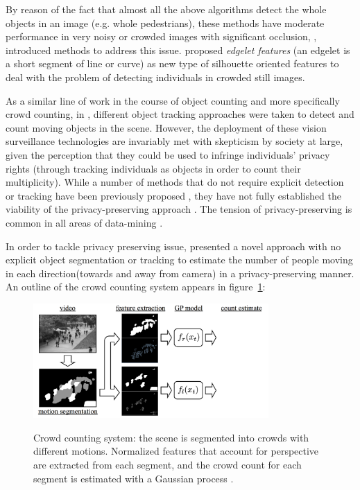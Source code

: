 By reason of the fact that almost all the above algorithms detect the whole objects in an image (e.g. whole pedestrians), these methods have moderate performance in very noisy or crowded images with significant occlusion, \citealt*{wu2005detection, lin2001estimation}, introduced methods to address this issue. \citealt*{wu2005detection} proposed \textit{edgelet features} (an edgelet is a short segment of line or curve) as new type of silhouette oriented features to deal with the problem of detecting individuals in crowded still images. %

\indent As a similar line of work in the course of object counting and more specifically crowd counting, in \cite{rabaud2006counting, brostow2006unsupervised, leibe2007coupled}, different object tracking approaches were taken to detect and count moving objects in the scene. However, the deployment of these vision surveillance technologies are invariably met with skepticism by society at large, given the perception that they could be used to infringe individuals' privacy rights (through tracking individuals as objects in order to count their multiplicity). While a number of methods that do not require explicit detection or tracking have been previously proposed \cite{paragios2001mrf, cho1999neural, regazzoni1996distributed, davies1995crowd, kong2005counting, marana1998efficacy, dong2007fast}, they have not fully established the viability of the privacy-preserving approach \cite{chan2008privacy}. The tension of privacy-preserving is common in all areas of data-mining \cite{vaidya2006privacy, verykios2004state}. 

In order to tackle privacy preserving issue, \citealt*{chan2008privacy} presented a novel approach with no explicit object segmentation or tracking to estimate the number of people moving in each direction(towards and away from camera) in a privacy-preserving manner. An outline of the crowd counting system appears in figure~\ref{fig:ucsd}:
\begin{figure}[H]
	\centering
	{\includegraphics[width=0.8\textwidth]{images/ucsdOutline}}
	\caption{Crowd counting system: the scene is segmented into crowds with different motions. Normalized features that account for perspective are extracted from each segment, and the crowd count for each segment is estimated with a Gaussian process \cite{chan2008privacy}.}
	\label{fig:ucsd}
\end{figure}

